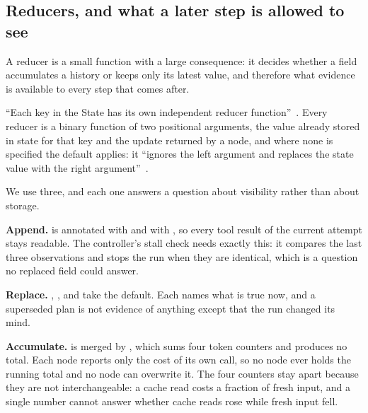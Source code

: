 \subsection{Reducers, and what a later step is allowed to see}
\label{sec:state-reducers}

A reducer is a small function with a large consequence: it decides whether a field accumulates a
history or keeps only its latest value, and therefore what evidence is available to every step that
comes after.

\begin{definition}[Reducer]
\label{def:reducer}
``Each key in the State has its own independent reducer function''~\citep{langgraph-graph-api}.
Every reducer is a binary function of two positional arguments, the value already stored in state
for that key and the update returned by a node, and where none is specified the default applies:
it ``ignores the left argument and replaces the state value with the right
argument''~\citep{langgraph-graph-api}.
\end{definition}

We use three, and each one answers a question about visibility rather than about storage.

\bi

\item \textbf{Append.}  is annotated with  and
 with , so every tool result of the current attempt stays
readable. The controller's stall check needs exactly this: it compares the last three observations
and stops the run when they are identical, which is a question no replaced field could answer.

\item \textbf{Replace.} , ,  and
 take the default. Each names what is true now, and a superseded plan is not
evidence of anything except that the run changed its mind.

\item \textbf{Accumulate.}  is merged by , which sums four token
counters and produces no total. Each node reports only the cost of its own call, so no node ever
holds the running total and no node can overwrite it. The four counters stay apart because they
are not interchangeable: a cache read costs a fraction of fresh input, and a single number cannot
answer whether cache reads rose while fresh input fell.

